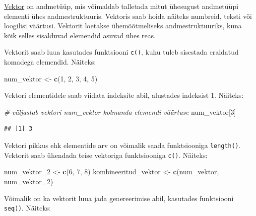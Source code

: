 \documentclass[
]{book}
\newenvironment{Shaded}{\begin{snugshade}}{\end{snugshade}}
\newcommand{\CommentTok}[1]{\textcolor[rgb]{0.56,0.35,0.01}{\textit{#1}}}
\newcommand{\DecValTok}[1]{\textcolor[rgb]{0.00,0.00,0.81}{#1}}
\newcommand{\FunctionTok}[1]{\textcolor[rgb]{0.13,0.29,0.53}{\textbf{#1}}}
\newcommand{\NormalTok}[1]{#1}
\newcommand{\OtherTok}[1]{\textcolor[rgb]{0.56,0.35,0.01}{#1}}
\renewenvironment{Shaded} {\begin{snugshade}\footnotesize} {\end{snugshade}}
\begin{document}
\href{https://sonaveeb.ee/search/unif/dlall/aso/vektor/1/est}{Vektor} on andmetüüp, mis võimaldab talletada mitut ühesugust andmetüüpi elementi ühes andmestruktuuris. Vektoris saab hoida näiteks numbreid, teksti või loogilisi väärtusi. Vektorit loetakse ühemõõtmeliseks andmestruktuuriks, kuna kõik selles sisalduvad elemendid asuvad ühes reas.

Vektorit saab luua kasutades funktsiooni \texttt{c()}, kuhu tuleb sisestada eraldatud komadega elemendid. Näiteks:

\begin{Shaded}
\begin{Highlighting}[]
\NormalTok{num\_vektor }\OtherTok{\textless{}{-}} \FunctionTok{c}\NormalTok{(}\DecValTok{1}\NormalTok{, }\DecValTok{2}\NormalTok{, }\DecValTok{3}\NormalTok{, }\DecValTok{4}\NormalTok{, }\DecValTok{5}\NormalTok{)}
\end{Highlighting}
\end{Shaded}

Vektori elementidele saab viidata indeksite abil, alustades indeksist 1. Näiteks:

\begin{Shaded}
\begin{Highlighting}[]
\CommentTok{\# väljastab vektori num\_vektor kolmanda elemendi väärtuse}
\NormalTok{num\_vektor[}\DecValTok{3}\NormalTok{] }
\end{Highlighting}
\end{Shaded}

\begin{verbatim}
## [1] 3
\end{verbatim}

Vektori pikkus ehk elementide arv on võimalik saada funktsiooniga \texttt{length()}. Vektorit saab ühendada teise vektoriga funktsiooniga \texttt{c()}. Näiteks:

\begin{Shaded}
\begin{Highlighting}[]
\NormalTok{num\_vektor\_2 }\OtherTok{\textless{}{-}} \FunctionTok{c}\NormalTok{(}\DecValTok{6}\NormalTok{, }\DecValTok{7}\NormalTok{, }\DecValTok{8}\NormalTok{)}
\NormalTok{kombineeritud\_vektor }\OtherTok{\textless{}{-}} \FunctionTok{c}\NormalTok{(num\_vektor, num\_vektor\_2)}
\end{Highlighting}
\end{Shaded}

Võimalik on ka vektorit luua jada genereerimise abil, kasutades funktsiooni \texttt{seq()}. Näiteks:
\end{document}
